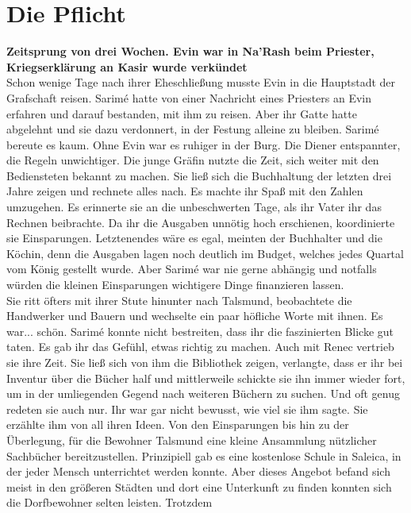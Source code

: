 
\chapter{Die Pflicht}

\textbf{Zeitsprung von drei Wochen. Evin war in Na'Rash beim Priester, Kriegserklärung an Kasir 
wurde verkündet}\\

Schon wenige Tage nach ihrer Eheschließung musste Evin in die Hauptstadt der Grafschaft reisen. 
Sarimé hatte von einer Nachricht eines Priesters an Evin erfahren und darauf bestanden, mit ihm zu 
reisen. Aber ihr Gatte hatte abgelehnt und sie dazu verdonnert, in der Festung alleine zu bleiben. 
Sarimé bereute es kaum. Ohne Evin war es ruhiger in der Burg. Die Diener entspannter, die Regeln 
unwichtiger. Die junge Gräfin nutzte die Zeit, sich weiter mit den Bediensteten bekannt zu machen. 
Sie ließ sich die Buchhaltung der letzten drei Jahre zeigen und rechnete alles nach. Es machte ihr 
Spaß mit den Zahlen umzugehen. Es erinnerte sie an die unbeschwerten Tage, als ihr Vater ihr das 
Rechnen beibrachte. Da ihr die Ausgaben unnötig hoch erschienen, koordinierte sie Einsparungen. 
Letztenendes wäre es egal, meinten der Buchhalter und die Köchin, denn die Ausgaben lagen noch 
deutlich im Budget, welches jedes Quartal vom König gestellt wurde. Aber Sarimé war nie gerne 
abhängig und notfalls würden die kleinen Einsparungen wichtigere Dinge finanzieren lassen. \\
Sie ritt öfters mit ihrer Stute hinunter nach Talsmund, beobachtete die Handwerker und 
Bauern und wechselte ein paar höfliche Worte mit ihnen. Es war... schön. Sarimé konnte nicht 
bestreiten, dass ihr die faszinierten Blicke gut taten. Es gab ihr das Gefühl, etwas richtig zu 
machen. Auch mit Renec vertrieb sie ihre Zeit. Sie ließ sich von ihm die Bibliothek zeigen, 
verlangte, dass er ihr bei Inventur über die Bücher half und mittlerweile schickte sie ihn immer 
wieder fort, um in der umliegenden Gegend nach weiteren Büchern zu suchen. Und oft genug redeten sie 
auch nur. Ihr war gar nicht bewusst, wie viel sie ihm sagte. Sie erzählte ihm von all ihren Ideen. 
Von den Einsparungen bis hin zu der Überlegung, für die Bewohner Talsmund eine kleine Ansammlung 
nützlicher Sachbücher bereitzustellen. Prinzipiell gab es eine kostenlose Schule in Saleica, in der 
jeder Mensch unterrichtet werden konnte. Aber dieses Angebot befand sich meist in den größeren 
Städten und dort eine Unterkunft zu finden konnten sich die Dorfbewohner selten leisten. Trotzdem 
